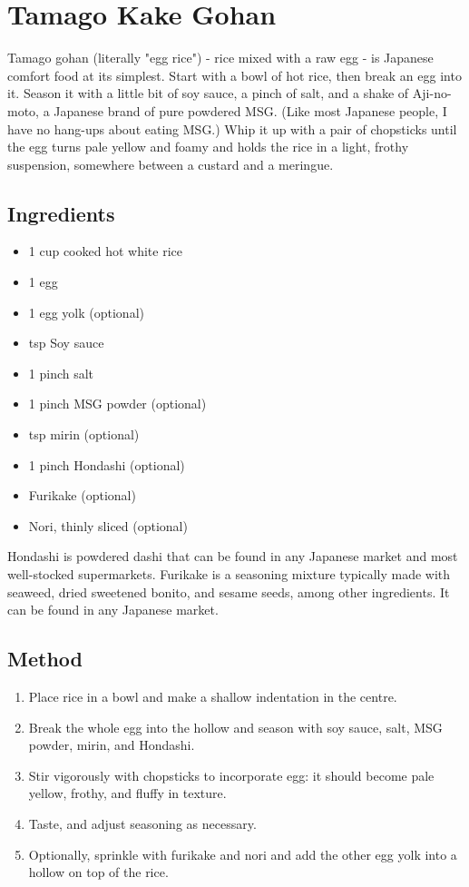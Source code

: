 \section{Tamago Kake Gohan}

  Tamago gohan (literally "egg rice") - rice mixed with a raw egg - is Japanese comfort food at its simplest. Start with a bowl of hot rice, then break an egg into it. Season it with a little bit of soy sauce, a pinch of salt, and a shake of Aji-no-moto, a Japanese brand of pure powdered MSG. (Like most Japanese people, I have no hang-ups about eating MSG.) Whip it up with a pair of chopsticks until the egg turns pale yellow and foamy and holds the rice in a light, frothy suspension, somewhere between a custard and a meringue.

  \begin{multicols}{2}
    \subsection{Ingredients}
      \begin{itemize}
        \item 1 cup cooked hot white rice
        \item 1 egg
        \item 1 egg yolk (optional)
        \item {} tsp Soy sauce
        \item 1 pinch salt
        \item 1 pinch MSG powder (optional)
        \item {} tsp mirin (optional)
        \item 1 pinch Hondashi (optional)
        \item Furikake (optional)
        \item Nori, thinly sliced (optional)
      \end{itemize}
      Hondashi is powdered dashi that can be found in any Japanese market and most well-stocked supermarkets. Furikake is a seasoning mixture typically made with seaweed, dried sweetened bonito, and sesame seeds, among other ingredients. It can be found in any Japanese market.
  \vfill\null
  \columnbreak
  \subsection{Method}
    \begin{enumerate}
      \item Place rice in a bowl and make a shallow indentation in the centre.
      \item Break the whole egg into the hollow and season with soy sauce, salt, MSG powder, mirin, and Hondashi.
      \item Stir vigorously with chopsticks to incorporate egg: it should become pale yellow, frothy, and fluffy in texture.
      \item Taste, and adjust seasoning as necessary.
      \item Optionally, sprinkle with furikake and nori and add the other egg yolk into a hollow on top of the rice.
    \end{enumerate}
  \end{multicols}
